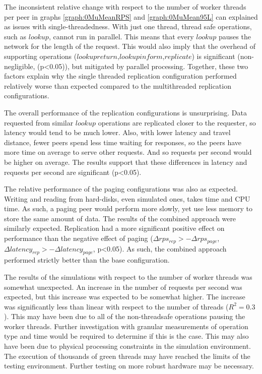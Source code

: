 \documentclass[12pt]{report}
\theoremstyle{plain}
\begin{document}
	The inconsistent relative change with respect to the number of worker threads per peer in graphs 
	\ref{graph:0MuMeanRPS} and \ref{graph:0MuMean95L} can explained as issues with single-threadedness.
	With just one thread, thread safe operations, such as $lookup$, cannot run in parallel. 
	This means that every $lookup$ pauses the network for the length of the request.
	This would also imply that the overhead of supporting operations ($lookupreturn$,$lookupinform$,$replicate$) is significant (non-negligible, (p<0.05)),
	but mitigated by parallel processing.
	Together, these two factors explain why the single threaded replication configuration performed relatively worse than expected compared to the multithreaded replication configurations.
	
	The overall performance of the replication configurations is unsurprising. 
	Data requested from similar $lookup$ operations are replicated closer to the requester, so latency would tend to be much lower. 
	Also, with lower latency and travel distance, 
	fewer peers spend less time waiting for responses, 
	so the peers have more time on average to serve other requests. 
	And so requests per second would be higher on average.
	The results support that these differences in latency and requests per second are significant (p<0.05).

	The relative performance of the paging configurations was also as expected.
	Writing and reading from hard-disks, even simulated ones, takes time and CPU time.
	As such, a paging peer would perform more slowly, yet use less memory to store the same amount of data. 
	The results of the combined approach were similarly expected.
	Replication had a more significant positive effect on performance than the negative effect of paging ($\Delta rps_{rep}>-\Delta rps_{page}$, $\Delta latency_{rep}>-\Delta latency_{page}$, p<0.05).
	As such, the combined approach performed strictly better than the base configuration.

	The results of the simulations with respect to the number of worker threads was somewhat unexpected.
	An increase in the number of requests per second was expected, but this increase was expected to be somewhat higher.
	The increase was significantly less than linear with respect to the number of threads ($R^2=0.3$).
	This may have been due to all of the non-threadsafe operations pausing the worker threads.
	Further investigation with granular measurements of operation type and time would be required to determine if this is the case.
	This may also have been due to physical processing constraints in the simulation environment.
	The execution of thousands of green threads may have reached the limits of the testing environment.
	Further testing on more robust hardware may be necessary.
\end{document}
